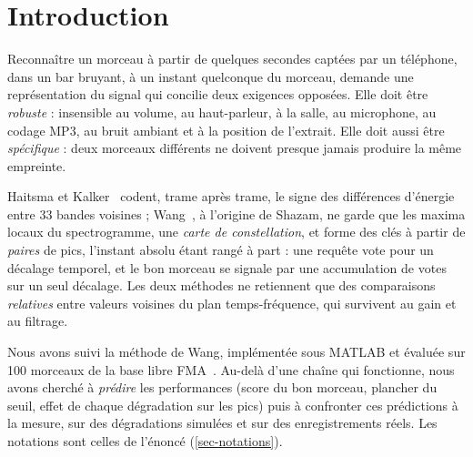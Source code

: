 \section{Introduction}
\label{sec-intro}

Reconnaître un morceau à partir de quelques secondes captées par un téléphone, dans un
bar bruyant, à un instant quelconque du morceau, demande une représentation du signal
qui concilie deux exigences opposées. Elle doit être \emph{robuste} : insensible au
volume, au haut-parleur, à la salle, au microphone, au codage MP3, au bruit ambiant et à
la position de l'extrait. Elle doit aussi être \emph{spécifique} : deux morceaux différents
ne doivent presque jamais produire la même empreinte.

Haitsma et Kalker~\cite{haitsma2002} codent, trame après trame, le signe des différences
d'énergie entre 33 bandes voisines ; Wang~\cite{wang2003}, à l'origine de Shazam, ne garde
que les maxima locaux du spectrogramme, une \emph{carte de constellation}, et forme des clés à
partir de \emph{paires} de pics, l'instant absolu étant rangé à part : une requête vote pour
un décalage temporel, et le bon morceau se signale par une accumulation de votes sur un seul
décalage. Les deux méthodes ne retiennent que des comparaisons \emph{relatives} entre valeurs
voisines du plan temps-fréquence, qui survivent au gain et au filtrage.

Nous avons suivi la méthode de Wang, implémentée sous MATLAB et évaluée sur 100 morceaux de
la base libre FMA~\cite{fma2017}. Au-delà d'une chaîne qui fonctionne, nous avons cherché à
\emph{prédire} les performances (score du bon morceau, plancher du seuil, effet de chaque
dégradation sur les pics) puis à confronter ces prédictions à la mesure, sur des dégradations
simulées et sur des enregistrements réels. Les notations sont celles de l'énoncé
(\cref{sec-notations}).
